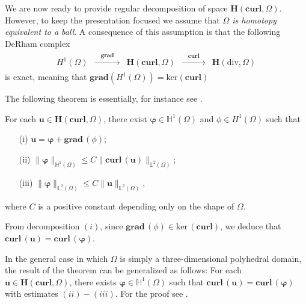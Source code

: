 We are now ready to provide regular decomposition of space $\bm{H}(\textbf{curl},\Omega)$. However, to keep the presentation focused we assume that {\em $\Omega$ is homotopy equivalent to a ball}. A consequence of this assumption is that the following DeRham complex 
\begin{align*}
    \begin{array}{ccccc}
   H^1(\Omega) & \xrightarrow{\quad \textbf{grad} \quad } & \bm{H}(\textbf{curl},\Omega) & \xrightarrow{\quad \textbf{curl} \quad } & \bm{H}(\text{div},\Omega)
  \end{array}
\end{align*}
is exact, meaning that $\textbf{grad} \left( H^1(\Omega)\right)=\text{ker}(\textbf{curl})$


The following theorem is essentially, for instance see \cite{pasciak2002overlapping,zhao2004analysis}.

\begin{theorem}\label{regular-decomposition-of-H(curl)}
For each $\mathbf{u} \in \bm{H}(\textbf{curl},\Omega)$, there exist $\bm{\varphi} \in \mathbb{H}^1(\Omega)$ and $\phi \in H^1(\Omega)$ such that
\begin{itemize}
\item[(i)] $\bm{u}=\bm{\varphi}+ \textbf{grad}\, (\phi)$;


\item[(ii)] $\|\bm{\varphi}\|_{\mathbb{H}^1(\Omega)} \leq C\|\textbf{curl}\,(\bm{u})\|_{\mathbb{L}^2(\Omega)}$;

\item[(iii)] $\|\bm{\varphi}\|_{\mathbb{L}^2(\Omega)} \leq C \|\bm{u}\|_{\mathbb{L}^2(\Omega)}$,
\end{itemize}
where $C$ is a positive constant depending only on the shape of $\Omega$.
\end{theorem}

\begin{remark}
From decomposition $(i)$, since $\textbf{grad}\, (\phi) \in \text{ker}\, (\textbf{curl})$, we deduce that $\textbf{curl}\,(\bm{u})=\textbf{curl}\,(\bm{\varphi})$.
\end{remark}

\begin{remark}
In the general case in which $\Omega$ is simply a three-dimensional polyhedral domain, the result of the theorem can be generalized  as follows: For each $\bm{u} \in \bm{H}(\textbf{curl},\Omega)$, there exists $\bm{\varphi} \in \mathbb{H}^1(\Omega)$ such that $\textbf{curl}\,(\bm{u})=\textbf{curl}\,(\bm{\varphi})$ with estimates $(ii)-(iii)$. For the proof see \cite{kolev2009parallel}.
\end{remark}

